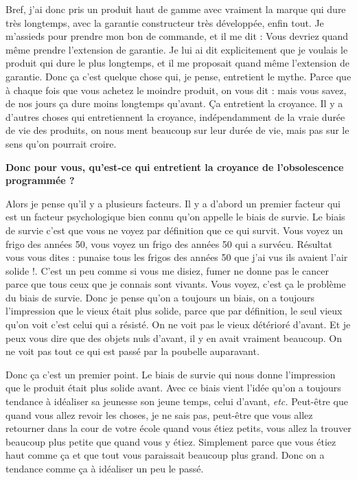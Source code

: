 \begin{small}
Bref, j'ai donc pris un produit haut de gamme avec vraiment la marque qui dure très longtemps, avec la garantie constructeur très développée, enfin tout. Je m'assieds pour prendre mon bon de commande, et il me dit : \og Vous devriez quand même prendre l'extension de garantie\fg{}. Je lui ai dit explicitement que je voulais le produit qui dure le plus longtemps, et il me proposait quand même l'extension de garantie. Donc ça c'est quelque chose qui, je pense, entretient le mythe. Parce que à chaque fois que vous achetez le moindre produit, on vous dit : \og mais vous savez, de nos jours ça dure moins longtemps qu'avant\fg{}. Ça entretient la croyance. Il y a d'autres choses qui entretiennent la croyance, indépendamment de la vraie durée de vie des produits, on nous ment beaucoup sur leur durée de vie, mais pas sur le sens qu'on pourrait croire.

\textbf{Donc pour vous, qu'est-ce qui entretient la croyance de l'obsolescence programmée ?}
\smallbreak


Alors je pense qu'il y a plusieurs facteurs. Il y a d'abord un premier facteur qui est un facteur psychologique bien connu qu'on appelle le biais de survie. Le biais de survie c'est que vous ne voyez par définition que ce qui survit. Vous voyez un frigo des années 50, vous voyez un frigo des années 50 qui a survécu. Résultat vous vous dites : \og punaise tous les frigos des années 50 que j'ai vus ils avaient l'air solide !\fg{}. C'est un peu comme si vous me disiez, fumer ne donne pas le cancer parce que tous ceux que je connais sont vivants. Vous voyez, c'est ça le problème du biais de survie. Donc je pense qu'on a toujours un biais, on a toujours l'impression que le vieux était plus solide, parce que par définition, le seul vieux qu'on voit c'est celui qui a résisté. On ne voit pas le vieux détérioré d'avant. Et je peux vous dire que des objets nuls d'avant, il y en avait vraiment beaucoup. On ne voit pas tout ce qui est passé par la poubelle auparavant.

Donc ça c'est un premier point. Le biais de survie qui nous donne l'impression que le produit était plus solide avant. Avec ce biais vient l'idée qu'on a toujours tendance à idéaliser sa jeunesse son jeune temps, celui d'avant, \textit{etc.} Peut-être que quand vous allez revoir les choses, je ne sais pas, peut-être que vous allez retourner dans la cour de votre école quand vous étiez petits, vous allez la trouver beaucoup plus petite que quand vous y étiez. Simplement parce que vous étiez haut comme ça et que tout vous paraissait beaucoup plus grand. Donc on a tendance comme ça à idéaliser un peu le passé.


\end{small}
